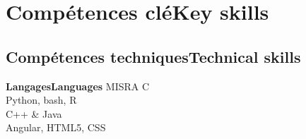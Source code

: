 \vspace{-1.3cm}

\ifnativelang
\newcommand{\CVheader}{6 ann\'ees d'exp\'erience en syst\`emes embarqu\'es critiques et r\'eseaux.}%
\else
\newcommand{\CVheader}{6+ years of experience in Real-Time systems, embedded linux and networking.\\
Experience in project steering and team management.}
\fi


\section{\ifnativelang Comp\'etences cl\'e\else Key skills\fi}

\ifaddmngt
\subsection{\ifnativelang Comp\'etences techniques\else Technical skills\fi}
\fi

\cvcomputer{
\textbf{\ifnativelang Syst\`emes embarqu\'es\else Embedded systems \fi}}{
\begin{itemize}
\item \ifnativelang OSs temps-r\'eel \else Real-time OSs \fi : Keil CMSIS, Contiki %
\item \ifnativelang Linux embarqu\'e : Buildroot, Busybox\else Embedded Linux : U-boot, Busybox \fi
\item \ifnativelang Bus de communication \& drivers \else Communication busses and drivers\fi
\end{itemize}
}
{\ifnativelang\textbf{Langages}\else \textbf{Languages}\fi}{
 MISRA C \\%
 Python, bash, R\\
 C++ \& Java \\
 Angular, HTML5, CSS
}

